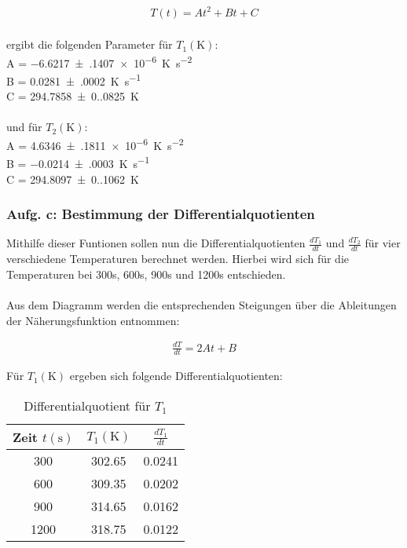 \begin{align*} 
  T(t) = At^2 + Bt + C 
\end{align*}
\\
ergibt die folgenden Parameter für $T_{1} (\unit{\kelvin})$: \\
A = \qty{-6.6217(1407)e-6}{\unit[per-mode=reciprocal]{\kelvin\per\second\squared}} \\
B = \qty{0.0281(0002)}{\unit[per-mode=reciprocal]{\kelvin\per\second}} \\
C = \qty{294.7858(0.0825)}{\unit\kelvin} \\
\\
und für $T_{2} (\unit{\kelvin})$: \\
A = \qty{4.6346(1811)e-6}{\unit[per-mode=reciprocal]{\kelvin\per\second\squared}} \\
B = \qty{-0.0214(0003)}{\unit[per-mode=reciprocal]{\kelvin\per\second}} \\
C = \qty{294.8097(0.1062)}{\unit\kelvin} \\

\newpage

\subsubsection{Aufg. c: Bestimmung der Differentialquotienten} \label{sec:aufg_c}

Mithilfe dieser Funtionen sollen nun die Differentialquotienten $\frac{dT_{1}}{dt}$ und $\frac{dT_{2}}{dt}$ 
für vier verschiedene Temperaturen berechnet werden. Hierbei wird sich für die Temperaturen bei 
300s, 600s, 900s und 1200s entschieden. 
\\\\
Aus dem Diagramm werden die entsprechenden Steigungen über die Ableitungen der Näherungsfunktion entnommen:

\begin{align*} 
  \frac{dT}{dt} = 2At + B 
\end{align*}

Für $T_{1} (\unit{\kelvin})$ ergeben sich folgende Differentialquotienten:

\begin{table}
  \centering
  \caption{Differentialquotient für $T_{1}$}
  \label{tab:berechnete_werte_T1}
  \begin{tabular}{c c c}
    \toprule
    {Zeit $t (\unit{\second})$} &
    {$T_{1} (\unit{\kelvin})$} &
    {$\frac{dT_{1}}{dt}$} \\
    \midrule
     300 & 302.65 &  0.0241 \\
     600 & 309.35 &  0.0202 \\
     900 & 314.65 &  0.0162 \\
    1200 & 318.75 &  0.0122 \\
    \bottomrule
  \end{tabular}
\end{table}

